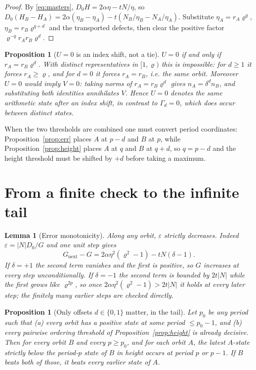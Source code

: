 \documentclass[11pt]{article}
\newtheorem{proposition}[theorem]{Proposition}
\newtheorem{lemma}[theorem]{Lemma}
\theoremstyle{definition}
\theoremstyle{remark}
\newcommand{\pr}{\varrho}
\newcommand{\gam}{\Gamma}
\begin{document}
\begin{proof}
By \eqref{eq:masters}, $D_0H=2\alpha\eta-tN/\eta$, so
$D_0(H_B-H_A)=2\alpha(\eta_B-\eta_A)-t(N_B/\eta_B-N_A/\eta_A)$. Substitute
$\eta_A=r_A\pr^{q}$, $\eta_B=r_B\pr^{q+d}$ and the transported defects, then clear the positive
factor $\pr^{-q}r_Ar_B\pr^{d}$.
\end{proof}

\begin{proposition}[$U=0$ is an index shift, not a tie]\label{prop:U0}
$U=0$ if and only if $r_A=r_B\pr^{d}$. With distinct representatives in $[1,\pr)$ this is
impossible: for $d\ge1$ it forces $r_A\ge\pr$, and for $d=0$ it forces $r_A=r_B$, i.e. the same
orbit. Moreover $U=0$ would imply $V=0$: taking norms of $r_A=r_B\pr^d$ gives
$n_A=\delta^dn_B$, and substituting both identities annihilates $V$. Hence $U=0$ denotes the
same arithmetic state after an index shift, in contrast to $\gam_d=0$, which does occur between
distinct states.
\end{proposition}

When the two thresholds are combined one must convert period coordinates:
Proposition~\ref{prop:err} places $A$ at $p-d$ and $B$ at $p$, while
Proposition~\ref{prop:height} places $A$ at $q$ and $B$ at $q+d$, so $q=p-d$ and the height
threshold must be shifted by $+d$ before taking a maximum.

\section{From a finite check to the infinite tail}\label{sec:tail}

\begin{lemma}[Error monotonicity]\label{lem:mono}
Along any orbit, $\varepsilon$ strictly decreases. Indeed $\varepsilon=|N|D_0/G$ and one unit
step gives
\begin{equation}\label{eq:Ginc}
G_{\mathrm{next}}-G=2\alpha\eta^2(\pr^2-1)-tN(\delta-1).
\end{equation}
If $\delta=+1$ the second term vanishes and the first is positive, so $G$ increases at every
step unconditionally. If $\delta=-1$ the second term is bounded by $2t|N|$ while the first grows
like $\pr^{2p}$, so once $2\alpha\eta^2(\pr^2-1)>2t|N|$ it holds at every later step; the
finitely many earlier steps are checked directly.
\end{lemma}

\begin{proposition}[Only offsets $d\in\{0,1\}$ matter, in the tail]\label{prop:window}
Let $p_0$ be any period such that \emph{(a)} every orbit has a positive state at some period
$\le p_0-1$, and \emph{(b)} every pairwise ordering threshold of
Proposition~\ref{prop:height} is already decisive. Then for every orbit $B$ and every
$p\ge p_0$, and for each orbit $A$, the latest $A$-state strictly below the period-$p$ state of
$B$ in height occurs at period $p$ or $p-1$. If $B$ beats both of those, it beats every earlier
state of $A$.
\end{proposition}
\end{document}
